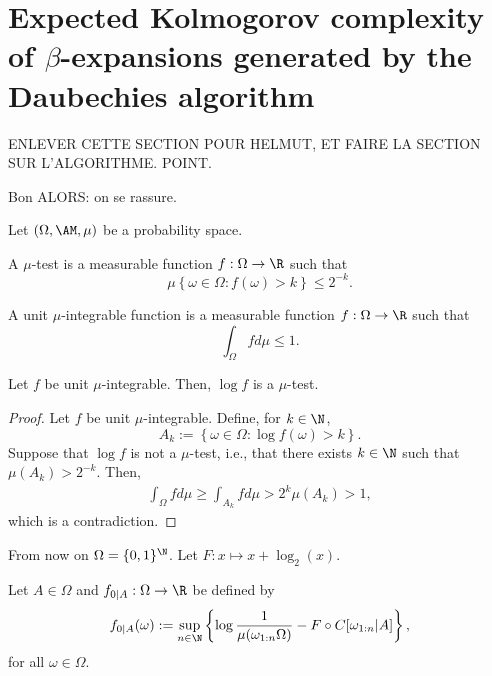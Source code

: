 
\section{\texorpdfstring{Expected Kolmogorov complexity of $\beta$-expansions generated by the Daubechies algorithm}{}}

ENLEVER CETTE SECTION POUR HELMUT, ET FAIRE LA SECTION SUR L'ALGORITHME. POINT.

Bon ALORS: on se rassure.

Let $(\Omega,\AM, \mu)$ be a probability space. 
\begin{definition}
    A $\mu$-test is a measurable function $f : \Omega \to \R$ such that 
    \begin{equation}
        \mu\left\{ \omega \in \Omega : f(\omega) > k \right\} \leq 2^{-k}.
    \end{equation}
\end{definition}
\begin{definition}
    A unit $\mu$-integrable function is a measurable function $f : \Omega \to \R$ such that 
    \begin{equation}
        \int_\Omega f d\mu \leq 1.
    \end{equation}
\end{definition}
\begin{theorem}
    Let $f$ be unit $\mu$-integrable. Then, $\log f$ is a $\mu$-test.
\end{theorem}
\begin{proof}
    Let $f$ be unit $\mu$-integrable. Define, for $k \in \N$,
    \begin{equation}
        A_k := \left\{ \omega \in \Omega :\log f(\omega) > k \right\}.
    \end{equation}
    Suppose that $\log f$ is not a $\mu$-test, i.e., that there exists $k \in \N$ such that $\mu(A_k) > 2^{-k}$. Then,
    \begin{align}
        \int_\Omega f d\mu \geq \int_{A_k} fd\mu > 2^k \mu(A_k) > 1,
    \end{align}
    which is a contradiction.
\end{proof}
\noindent From now on $\Omega = \{0,1\}^\N$. Let $F : x \mapsto x + \log_2(x)$.
\begin{definition}
    Let $A \in \Omega$ and $f_{0|A} : \Omega \to \R$ be defined by 
    \begin{equation}
        f_{0|A}(\omega) := \sup_{n \in \N} \left\{ \log \frac{1}{\mu(\omega_{1:n}\Omega)} - F\circ C[\omega_{1:n}|A] \right\},
    \end{equation}
    for all $\omega \in \Omega$.
\end{definition}
